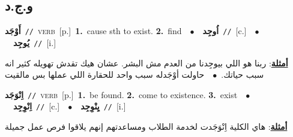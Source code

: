 \documentclass[10pt,a4paper,twoside]{article} %
\begin{document}
\begin{multicols}{2}
\vspace{-3mm}
\subsection*{\color{blue}\foreignlanguage{arabic}{و.ج.د}\color{blue}{}} 

{\setlength\topsep{0pt}\textbf{\foreignlanguage{arabic}{أَوْجَد}}\ {\color{gray}\texttt{//}\color{black}}\ \textsc{verb}\ [p.]\ \textbf{1.}~cause sth to exist.  \textbf{2.}~find\ \ $\bullet$\ \ \setlength\topsep{0pt}\textbf{\foreignlanguage{arabic}{اُوجِد}}\ {\color{gray}\texttt{//}\color{black}}\ [c.]\ \ $\bullet$\ \ \setlength\topsep{0pt}\textbf{\foreignlanguage{arabic}{يُوجِد}}\ {\color{gray}\texttt{//}\color{black}}\ [i.]\  \begin{flushright}\color{gray}\foreignlanguage{arabic}{\textbf{\underline{\foreignlanguage{arabic}{أمثلة}}}: ربنا هو اللي بيوجِدنا من العدم مش البشر. عشان هيك تقدش تهويله كثير انه سبب حياتك.\ $\bullet$\ \  حاولت أوْجَدله سبب واحد للحقارة اللي عملها بس مالقيت}\end{flushright}\color{black}} \vspace{2mm}

{\setlength\topsep{0pt}\textbf{\foreignlanguage{arabic}{اِنْوَجَد}}\ {\color{gray}\texttt{//}\color{black}}\ \textsc{verb}\ [p.]\ \textbf{1.}~be found.  \textbf{2.}~come to existence.  \textbf{3.}~exist\ \ $\bullet$\ \ \setlength\topsep{0pt}\textbf{\foreignlanguage{arabic}{اِنْوِجِد}}\ {\color{gray}\texttt{//}\color{black}}\ [c.]\ \ $\bullet$\ \ \setlength\topsep{0pt}\textbf{\foreignlanguage{arabic}{يِنْوِجِد}}\ {\color{gray}\texttt{//}\color{black}}\ [i.]\  \begin{flushright}\color{gray}\foreignlanguage{arabic}{\textbf{\underline{\foreignlanguage{arabic}{أمثلة}}}: هاي الكلية اِنْوَجَدت لخدمة الطلاب ومساعدتهم إنهم يلاقوا فرص عمل جميلة}\end{flushright}\color{black}} \vspace{2mm}


\end{multicols}
\end{document}
